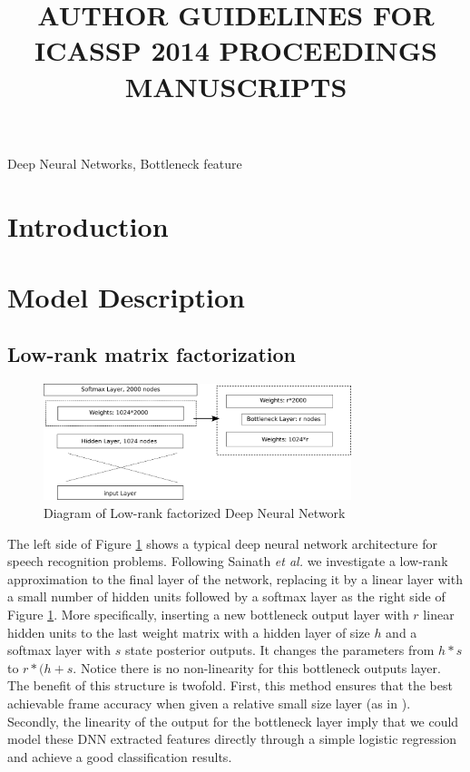 \documentclass{article}
\title{AUTHOR GUIDELINES FOR ICASSP 2014 PROCEEDINGS MANUSCRIPTS}
\begin{document}
%
\maketitle
%
\begin{abstract}
\end{abstract}
%
\begin{keywords}
Deep Neural Networks, Bottleneck feature
\end{keywords}
%
\section{Introduction}
\label{sec:intro}

\section{Model Description}

\subsection{Low-rank matrix factorization}
\begin{figure}[htb]
  \centering
  \centerline{\includegraphics[width=0.8\textwidth]{lrDNN.eps}}
  \caption{Diagram of Low-rank factorized Deep Neural Network}
  \label{ref:lrDNN}
\end{figure}

The left side of Figure \ref{ref:lrDNN} shows a typical deep neural network architecture for speech recognition problems. Following Sainath {\it{et al.}} \cite{Tara2013} we investigate a low-rank approximation to the final layer of the network, replacing it by a linear layer with a small number of hidden units followed by a softmax layer as the right side of Figure \ref{ref:lrDNN}. More specifically, inserting a new bottleneck output layer with $r$ linear hidden units to the last
weight matrix with a hidden layer of size $h$ and a softmax layer with $s$ state posterior outputs. It changes the parameters from $h*s$ to $r*(h+s$. Notice there is no non-linearity for this bottleneck outputs layer. The benefit of this structure is twofold. First, this method ensures that the best achievable frame accuracy when given a relative small size layer (as in \cite{Tara2013}). Secondly, the linearity of the output for the bottleneck layer imply that we could model
these DNN extracted features directly through a simple logistic regression and achieve a good classification results.
\end{document}
